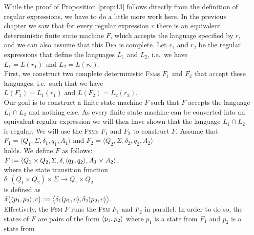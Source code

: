 \proofEng
While the proof of Proposition \ref{prop:13} follows directly from the definition of regular expressions,
we have to do a little more work here. In the previous chapter we saw that for every regular expression
$r$ there is an equivalent deterministic finite state machine $F$, which accepts the language specified by $r$,
and we can also assume that this \textsc{Dfa} is complete. Let $r_1$ and $r_2$ be the regular expressions that
define the languages $L_1$ and $L_2$, i.e.~we have
\\[0.2cm]
\hspace*{1.3cm}
$L_1 = L(r_1)$ \quad und \quad $L_2 = L(r_2)$.
\\[0.2cm]
First, we construct two complete deterministic \textsc{Fsm}s
$F_1$ and $F_2$ that accept these languages, i.e.~such that we have
\\[0.2cm]
\hspace*{1.3cm}
$L(F_1) = L_1(r_1)$ \quad and \quad $L(F_2) = L_2(r_2)$.
\\[0.2cm]
Our goal is to construct a finite state machine $F$ such that $F$ accepts the language
$L_1 \cap L_2$ and nothing else.  As every finite state machine can be converted into an equivalent regular
expression we will then have shown that the language
$L_1 \cap L_2$ is regular.  We will use the \textsc{Fsm}s $F_1$ and $F_2$ to construct $F$.
Assume that
\\[0.2cm]
\hspace*{1.3cm}
$F_1 = \langle Q_1, \Sigma, \delta_1, q_1, A_1 \rangle$ \quad and \quad
$F_2 = \langle Q_2, \Sigma, \delta_2, q_2, A_2 \rangle$
\\[0.2cm]
holds.  We define $F$ as follows:
\\[0.2cm]
\hspace*{1.3cm}
$F := \langle Q_1 \times Q_2, \Sigma, \delta, \pair(q_1,q_2), A_1 \times A_2 \rangle$,
\\[0.2cm]
where the state transition function 
\\[0.2cm]
\hspace*{1.3cm}
 $\delta: (Q_1 \times Q_2) \times \Sigma \rightarrow Q_1 \times Q_2$ 
\\[0.2cm]
is defined as
\\[0.2cm]
\hspace*{1.3cm}
$\delta\bigl( \pair(p_1, p_2), c \bigr) := \bigl\langle\delta_1(p_1,c), \delta_2(p_2,c)\bigr\rangle$.
\\[0.2cm]
Effectively, the \textsc{Fsm} $F$ runs the \textsc{Fsm} $F_1$ and $F_2$ in parallel.  In order to do so, the
states of $F$ are pairs of the form $\pair(p_1,p_2)$ where $p_1$ is a state from $F_1$ and $p_2$ is a state from
